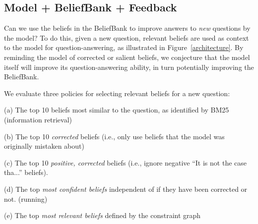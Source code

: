 \documentclass[11pt]{article}
\newenvironment{des}{                 %
     \parskip 0cm \begin{list}{}{\parsep 0cm \itemsep 0cm \topsep 0cm}}{
       \end{list}} %
\begin{document}

\subsection{Model + BeliefBank + Feedback}

Can we use the beliefs in the BeliefBank to improve answers to {\it new} questions by the model?
To do this, given a new question, relevant beliefs are used as 
context to the model for question-answering, as illustrated in Figure~\ref{architecture}. 
By reminding the model of corrected or salient beliefs, we conjecture that the model itself
will improve its question-answering ability, in turn potentially improving the
BeliefBank.

We evaluate three policies for selecting relevant beliefs for a new question:
\begin{des}
\item[(a)] The top 10 beliefs most similar to the question, as identified by BM25 (information retrieval)

\item[(b)] The top 10 {\it corrected} beliefs (i.e., only use beliefs that the model was originally mistaken about)
\item[(c)] The top 10 {\it positive, corrected} beliefs (i.e., ignore negative ``It is not the case tha...'' beliefs).

\item[(d)] The top {\it most confident beliefs} independent of if they have been corrected or not. (running)
\item[(e)] The top {\it most relevant beliefs} defined by the constraint graph
\end{des}
\end{document}
